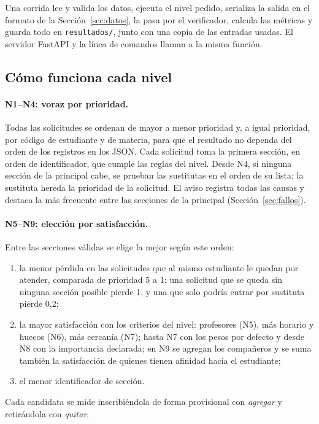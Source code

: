 Una corrida lee y valida los datos, ejecuta el nivel pedido, serializa la salida en el formato de la Sección~\ref{sec:datos}, la pasa por el verificador, calcula las métricas y guarda todo en \texttt{resultados/}, junto con una copia de las entradas usadas. El servidor FastAPI y la línea de comandos llaman a la misma función.

\subsection{Cómo funciona cada nivel}

\paragraph{N1--N4: voraz por prioridad.} Todas las solicitudes se ordenan de mayor a menor prioridad y, a igual prioridad, por código de estudiante y de materia, para que el resultado no dependa del orden de los registros en los JSON. Cada solicitud toma la primera sección, en orden de identificador, que cumple las reglas del nivel. Desde N4, si ninguna sección de la principal cabe, se prueban las sustitutas en el orden de su lista; la sustituta hereda la prioridad de la solicitud. El aviso registra todas las causas y destaca la más frecuente entre las secciones de la principal (Sección~\ref{sec:fallos}).

\paragraph{N5--N9: elección por satisfacción.} Entre las secciones válidas se elige la mejor según este orden:
\begin{enumerate}
\item la menor pérdida en las solicitudes que al mismo estudiante le quedan por atender, comparada de prioridad 5 a 1: una solicitud que se queda sin ninguna sección posible pierde 1, y una que solo podría entrar por sustituta pierde 0,2;
\item la mayor satisfacción con los criterios del nivel: profesores (N5), más horario y huecos (N6), más cercanía (N7); hasta N7 con los pesos por defecto y desde N8 con la importancia declarada; en N9 se agregan los compañeros y se suma también la satisfacción de quienes tienen afinidad hacia el estudiante;
\item el menor identificador de sección.
\end{enumerate}
Cada candidata se mide inscribiéndola de forma provisional con \emph{agregar} y retirándola con \emph{quitar}.

